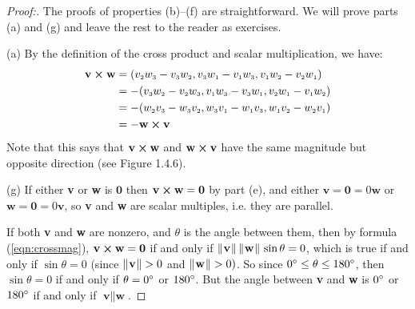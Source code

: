 \begin{proofbar}\begin{proof}[Proof:]
 The proofs of properties (b)--(f) are straightforward. We will prove parts (a) and (g) and leave the rest to the
 reader as exercises.
 \piccaption[]{}
 \par\noindent(a)
 By the definition of the cross product and scalar multiplication, we have:
 \begin{align*}
  \textbf{v} \bm{\times} \textbf{w} &= (v_{\scriptscriptstyle 2}w_{\scriptscriptstyle 3} - v_{\scriptscriptstyle 3}w_{\scriptscriptstyle 2},
   v_{\scriptscriptstyle 3}w_{\scriptscriptstyle 1} - v_{\scriptscriptstyle 1}w_{\scriptscriptstyle 3}, v_{\scriptscriptstyle 1}w_{\scriptscriptstyle 2} - v_{\scriptscriptstyle 2}w_{\scriptscriptstyle 1})\\
  &= -(v_{\scriptscriptstyle 3}w_{\scriptscriptstyle 2} - v_{\scriptscriptstyle 2}w_{\scriptscriptstyle 3},
   v_{\scriptscriptstyle 1}w_{\scriptscriptstyle 3} - v_{\scriptscriptstyle 3}w_{\scriptscriptstyle 1}, v_{\scriptscriptstyle 2}w_{\scriptscriptstyle 1} - v_{\scriptscriptstyle 1}w_{\scriptscriptstyle 2})\\
  &= -(w_{\scriptscriptstyle 2}v_{\scriptscriptstyle 3} - w_{\scriptscriptstyle 3}v_{\scriptscriptstyle 2},
   w_{\scriptscriptstyle 3}v_{\scriptscriptstyle 1} - w_{\scriptscriptstyle 1}v_{\scriptscriptstyle 3}, w_{\scriptscriptstyle 1}v_{\scriptscriptstyle 2} - w_{\scriptscriptstyle 2}v_{\scriptscriptstyle 1})\\
  &= -\textbf{w} \bm{\times} \textbf{v}
 \end{align*}
 Note that this says that $\textbf{v} \bm{\times} \textbf{w}$ and $\textbf{w} \bm{\times} \textbf{v}$ have the same
 magnitude but opposite direction (see Figure 1.4.6).
 \par\noindent(g)
 If either \textbf{v} or \textbf{w} is $\textbf{0}$ then $\textbf{v} \bm{\times} \textbf{w} = \textbf{0}$ by part (e),
 and either $\textbf{v} = \textbf{0} = 0\textbf{w}$ or $\textbf{w} = \textbf{0} = 0\textbf{v}$, so \textbf{v} and
 \textbf{w} are scalar multiples, i.e. they are parallel.
 
 If both \textbf{v} and \textbf{w} are nonzero, and $\theta$ is the angle between them, then by formula
 (\ref{eqn:crossmag}), $\textbf{v} \bm{\times} \textbf{w} = \textbf{0}$ if and only if
 $\lVert\mspace{1mu}\textbf{v}\mspace{1mu}\rVert\,\lVert\mspace{1mu}\textbf{w}\mspace{1mu}\rVert\,\sin \theta = 0$, which is true if and only if $\sin \theta = 0$ (since
 $\lVert\mspace{1mu}\textbf{v}\mspace{1mu}\rVert > 0$ and $\lVert\mspace{1mu}\textbf{w}\mspace{1mu}\rVert > 0)$. So since $0^\circ \le \theta \le 180^\circ$, then
 $\sin \theta = 0$ if and only if $\theta = 0^\circ$ or $180^\circ$. But the angle between \textbf{v} and \textbf{w}
 is $0^\circ$ or $180^\circ$ if and only if $\textbf{v} \parallel \textbf{w}$.
\end{proof}\end{proofbar}

